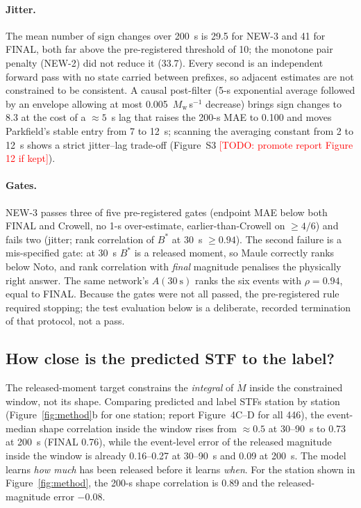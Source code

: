 \documentclass[12pt,letterpaper]{article}
\newcommand{\Mw}{M_{\mathrm{w}}}
\newcommand{\todo}[1]{\textcolor{red}{[TODO: #1]}}
\newcommand{\Mdot}{\dot{M}}
\begin{document}
\paragraph{Jitter.} The mean number of sign changes over 200~s is 29.5 for NEW-3 and 41 for FINAL, both far above the pre-registered threshold of 10; the monotone pair penalty (NEW-2) did not reduce it (33.7). Every second is an independent forward pass with no state carried between prefixes, so adjacent estimates are not constrained to be consistent. A causal post-filter (5-s exponential average followed by an envelope allowing at most 0.005~$\Mw$\,s$^{-1}$ decrease) brings sign changes to 8.3 at the cost of a $\approx5$~s lag that raises the 200-s MAE to 0.100 and moves Parkfield's stable entry from 7 to 12~s; scanning the averaging constant from 2 to 12~s shows a strict jitter--lag trade-off (Figure~S3 \todo{promote report Figure 12 if kept}).

\paragraph{Gates.} NEW-3 passes three of five pre-registered gates (endpoint MAE below both FINAL and Crowell, no 1-s over-estimate, earlier-than-Crowell on $\geq4/6$) and fails two (jitter; rank correlation of $B^*$ at 30~s $\geq0.94$). The second failure is a mis-specified gate: at 30~s $B^*$ is a released moment, so Maule correctly ranks below Noto, and rank correlation with \emph{final} magnitude penalises the physically right answer. The same network's $A(30~\mathrm{s})$ ranks the six events with $\rho=0.94$, equal to FINAL. Because the gates were not all passed, the pre-registered rule required stopping; the test evaluation below is a deliberate, recorded termination of that protocol, not a pass.

\subsection{How close is the predicted STF to the label?}

The released-moment target constrains the \emph{integral} of $\Mdot$ inside the constrained window, not its shape. Comparing predicted and label STFs station by station (Figure~\ref{fig:method}b for one station; report Figure~4C--D for all 446), the event-median shape correlation inside the window rises from $\approx0.5$ at 30--90~s to 0.73 at 200~s (FINAL 0.76), while the event-level error of the released magnitude inside the window is already 0.16--0.27 at 30--90~s and 0.09 at 200~s. The model learns \emph{how much} has been released before it learns \emph{when}. For the station shown in Figure~\ref{fig:method}, the 200-s shape correlation is 0.89 and the released-magnitude error $-0.08$.
\end{document}
